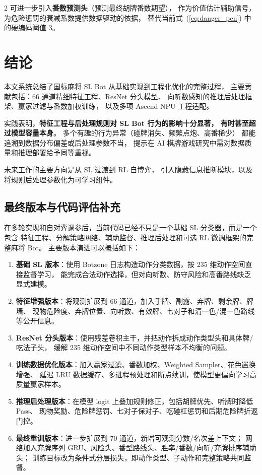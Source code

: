 \documentclass{article}
\begin{document}
\begin{multicols}{2}
可进一步引入\textbf{番数预测头}（预测最终胡牌番数期望），
作为价值估计辅助信号，为危险惩罚的衰减系数提供数据驱动的依据，
替代当前式~(\ref{eq:danger_pen}) 中的硬编码阈值 3。

\section{结论}
\label{sec:conclusion}

本文系统总结了国标麻将 SL Bot 从基础实现到工程化优化的完整过程，
主要贡献包括：66 通道精细特征工程、ResNet 分头模型、
向听数感知的推理后处理框架、赢家过滤与番数加权训练，
以及多项 Ascend NPU 工程适配。

实践表明，\textbf{特征工程与后处理规则对 SL Bot 行为的影响十分显著，
有时甚至超过模型容量本身}。
多个有趣的行为异常（碰牌消失、频繁点炮、高番稀少）
都能追溯到数据分布偏差或后处理参数不当，
提示在 AI 棋牌游戏研究中需对数据质量和推理部署给予同等重视。

未来工作的主要方向是从 SL 过渡到 RL 自博弈，
引入隐藏信息推断模块，以及将规则后处理参数化为可学习组件。

\subsection{最终版本与代码评估补充}

在多轮实现和自对弈调参后，当前代码已经不只是一个基础 SL 分类器，而是一个包含
特征工程、分解策略网络、辅助监督、推理后处理和可选 RL 微调框架的完整麻将 Bot。
主要版本演进可以概括如下：

\begin{enumerate}
  \item \textbf{基础 SL 版本}：使用 Botzone 日志构造动作分类数据，按 235 维动作空间直接监督学习，
  能完成合法动作选择，但对向听数、防守风险和高番路线缺乏显式建模。
  \item \textbf{特征增强版本}：将观测扩展到 66 通道，加入手牌、副露、弃牌、剩余牌、牌墙、
  现物危险度、弃牌位置、向听数、有效牌、七对子和清一色/混一色路线等公开信息。
  \item \textbf{ResNet 分头版本}：使用残差卷积主干，并把动作拆成动作类型头和具体牌/吃法子头，
  缓解 235 维动作空间中不同动作类型样本不均衡的问题。
  \item \textbf{训练数据优化版本}：加入赢家过滤、番数加权、Weighted Sampler、花色置换增强、
  延迟 LRU 数据缓存、多进程预处理和断点续训，使模型更偏向学习高质量赢家样本。
  \item \textbf{推理后处理版本}：在模型 logit 上叠加规则修正，包括胡牌优先、听牌时降低 Pass、
  现物奖励、危险牌惩罚、七对子保对子、吃碰杠惩罚和后期危险牌折返门控。
  \item \textbf{最终重训版本}：进一步扩展到 70 通道，新增可观测分数/名次差上下文；
  网络加入弃牌序列 GRU、风险头、番型路线头、胜率/番数/向听/弃牌排序辅助头；
  训练目标改为条件式分层损失，即动作类型、子动作和完整策略共同监督。
\end{enumerate}


\end{multicols}
\end{document}
